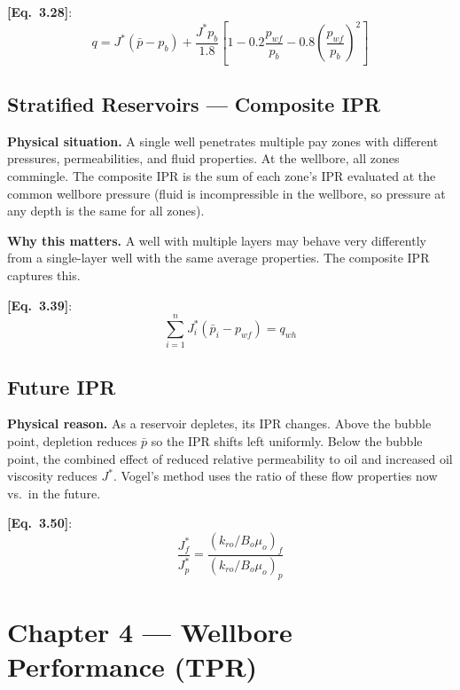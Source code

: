 \documentclass[11pt,a4paper,openany]{book}
\newcommand{\eqrefbook}[1]{\textcolor{blue!60!black}{\textbf{[Eq.~#1]}}}
\begin{document}
\eqrefbook{3.28}:
\begin{equation}
  q = J^*(\bar{p} - p_b) + \frac{J^*p_b}{1.8}\left[
    1 - 0.2\frac{p_{wf}}{p_b} - 0.8\left(\frac{p_{wf}}{p_b}\right)^2
  \right]
\end{equation}

\section{Stratified Reservoirs — Composite IPR}

\begin{theory}
\textbf{Physical situation.} A single well penetrates multiple pay
zones with different pressures, permeabilities, and fluid properties.
At the wellbore, all zones commingle. The composite IPR is the sum of
each zone's IPR evaluated at the common wellbore pressure (fluid is
incompressible in the wellbore, so pressure at any depth is the same
for all zones).

\textbf{Why this matters.} A well with multiple layers may behave
very differently from a single-layer well with the same average
properties. The composite IPR captures this.
\end{theory}

\eqrefbook{3.39}:
\begin{equation}
  \sum_{i=1}^n J_i^*(\bar{p}_i - p_{wf}) = q_{wh}
\end{equation}

\section{Future IPR}

\begin{theory}
\textbf{Physical reason.} As a reservoir depletes, its IPR changes.
Above the bubble point, depletion reduces $\bar{p}$ so the IPR shifts
left uniformly. Below the bubble point, the combined effect of
reduced relative permeability to oil and increased oil viscosity
reduces $J^*$. Vogel's method uses the ratio of these flow properties
now vs.\ in the future.
\end{theory}

\eqrefbook{3.50}:
\begin{equation}
  \frac{J_f^*}{J_p^*} = \frac{(k_{ro}/B_o\mu_o)_f}
                              {(k_{ro}/B_o\mu_o)_p}
\end{equation}

\chapter{Chapter 4 — Wellbore Performance (TPR)}
\end{document}
